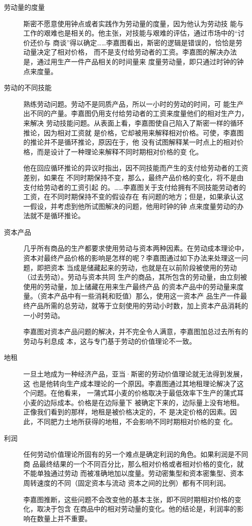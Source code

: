 \begin{description}
\item[劳动量的度量] 斯密不愿意使用钟点或者实践作为劳动量的度量，因为他认为劳动技
  能与工作的艰难也是相关的。他主张，对技能与艰难的评估，通过市场中的“讨价还价与
  商谈”得以确定……李嘉图看出，斯密的逻辑是错误的，恰恰是劳动量决定了相对价格，
  而不是支付给劳动者的工资。李嘉图的解决办法是，通过用生产一件产品相关的时间量来
  度量劳动量，即只通过时钟的钟点来度量。


\item[劳动的不同技能] 熟练劳动问题。劳动不是同质产品，所以一小时的劳动的时间，可
  能生产出不同的产量。李嘉图仍用支付给劳动者的工资来度量他们的相对生产力，来解决
  劳动技能问题。从表面上看，李嘉图使自己陷入了斯密一样的循环推论，因为相对工资就
  是价格，它却被用来解释相对价格。可使，李嘉图的推论并不是循环推论，原因在于，他
  没有试图解释某一时点上的相对价格，而是设计了一种理论来解释不同时期相对价格的变
  化。

  他在回应循环推论的异议时指出，因不同技能而产生的支付给劳动者的工资差别，如果在
  不同时期保持不变，那么，最终产品价格的变化，将不是由支付给劳动者的工资引起
  的。……李嘉图关于支付给拥有不同技能劳动者的工资，在不同时期保持不变的假设存在
  有问题的地方；但是，如果承认这一假设，并考虑到他所试图解决的问题，他用时钟的钟
  点来度量劳动的办法就不是循环推论。


\item[资本产品] 几乎所有商品的生产都要求使用劳动与资本两种因素。在劳动成本理论中，
  资本对最终产品价格的影响是怎样的呢？李嘉图通过如下办法来处理这一问题，即把资本
  当成是储藏起来的劳动，也就是在以前阶段被使用的劳动（过去劳动）。劳动与资本共同
  生产的商品，其所包含的劳动量，由立刻被使用的劳动量，加上储藏在用来生产最终产品
  的资本产品中的劳动量来度量。（资本产品中有一些消耗和贬值）那么，使用这一资本产
  品生产一件最终产品所需的总劳动，就等于立刻使用的劳动小时数，加上资本产品消耗的
  一小时劳动。

  李嘉图对资本产品问题的解决，并不完全令人满意，李嘉图加总过去所有的劳动与利息成
  本，这与专门基于劳动的价值理论不一致。


\item[地租] 一旦土地成为一种经济产品，亚当·斯密的劳动价值理论就无法得到发展，这
  也是他转向生产成本理论的一个原因。李嘉图通过其地租理论解决了这个问题。在他看来，
  一蒲式耳小麦的价格取决于最低效率下生产的蒲式耳小麦的边际成本。价格是在边际量下
  被确定下来的，边际量上没有地租。正像我们看到的那样，地租是被价格决定的，不
  是决定价格的因素。因此，不同肥力土地所获得的地租，不会影响不同时期相对价格的变
  化。


\item[利润] 任何劳动价值理论所固有的另一个难点是确定利润的角色。如果利润是不同商
  品最终结果的一个不同百分比，那么相对价格或者相对价格的变化，就不能单独通过劳动
  而被准确地加以度量。劳动密集型和资本密集型、资本周转速度的不同（固定资本与流动
  资本之间的比例）都有不同利润。

  李嘉图推断，这些问题不会改变他的基本主张，即不同时期相对价格的变化，取决于包含
  在商品中的相对劳动量的变化。他的结论是，利润率的影响在数量上并不重要。
\end{description}

